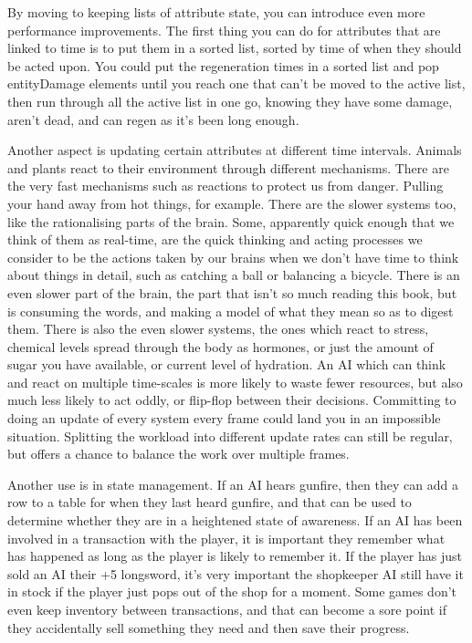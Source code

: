 \documentclass[a4paper,12pt]{article}
\begin{document}
By moving to keeping lists of attribute state, you can introduce even more performance improvements.
The first thing you can do for attributes that are linked to time is to put them in a sorted list, sorted by time of when they should be acted upon.
You could put the regeneration times in a sorted list and pop entityDamage elements until you reach one that can't be moved to the active list, then run through all the active list in one go, knowing they have some damage, aren't dead, and can regen as it's been long enough.

Another aspect is updating certain attributes at different time intervals.
Animals and plants react to their environment through different mechanisms.
There are the very fast mechanisms such as reactions to protect us from danger.
Pulling your hand away from hot things, for example.
There are the slower systems too, like the rationalising parts of the brain.
Some, apparently quick enough that we think of them as real-time, are the quick thinking and acting processes we consider to be the actions taken by our brains when we don't have time to think about things in detail, such as catching a ball or balancing a bicycle.
There is an even slower part of the brain, the part that isn't so much reading this book, but is consuming the words, and making a model of what they mean so as to digest them.
There is also the even slower systems, the ones which react to stress, chemical levels spread through the body as hormones, or just the amount of sugar you have available, or current level of hydration.
An AI which can think and react on multiple time-scales is more likely to waste fewer resources, but also much less likely to act oddly, or flip-flop between their decisions.
Committing to doing an update of every system every frame could land you in an impossible situation.
Splitting the workload into different update rates can still be regular, but offers a chance to balance the work over multiple frames.

Another use is in state management.
If an AI hears gunfire, then they can add a row to a table for when they last heard gunfire, and that can be used to determine whether they are in a heightened state of awareness.
If an AI has been involved in a transaction with the player, it is important they remember what has happened as long as the player is likely to remember it.
If the player has just sold an AI their +5 longsword, it's very important the shopkeeper AI still have it in stock if the player just pops out of the shop for a moment.
Some games don't even keep inventory between transactions, and that can become a sore point if they accidentally sell something they need and then save their progress.
\end{document}
